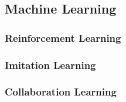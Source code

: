 \subsection{Machine Learning}
\subsubsection{Reinforcement Learning}

\subsubsection{Imitation Learning}

\subsubsection{Collaboration Learning}

